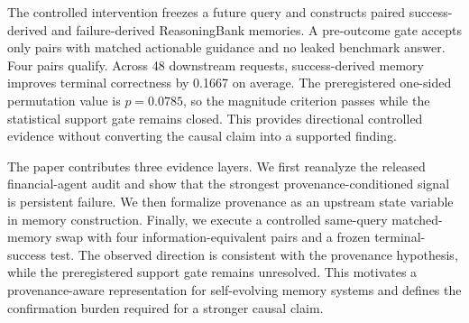 The controlled intervention freezes a future query and constructs paired success-derived and failure-derived ReasoningBank memories. A pre-outcome gate accepts only pairs with matched actionable guidance and no leaked benchmark answer. Four pairs qualify. Across 48 downstream requests, success-derived memory improves terminal correctness by 0.1667 on average. The preregistered one-sided permutation value is $p=0.0785$, so the magnitude criterion passes while the statistical support gate remains closed. This provides directional controlled evidence without converting the causal claim into a supported finding.

The paper contributes three evidence layers. We first reanalyze the released financial-agent audit and show that the strongest provenance-conditioned signal is persistent failure. We then formalize provenance as an upstream state variable in memory construction. Finally, we execute a controlled same-query matched-memory swap with four information-equivalent pairs and a frozen terminal-success test. The observed direction is consistent with the provenance hypothesis, while the preregistered support gate remains unresolved. This motivates a provenance-aware representation for self-evolving memory systems and defines the confirmation burden required for a stronger causal claim.
